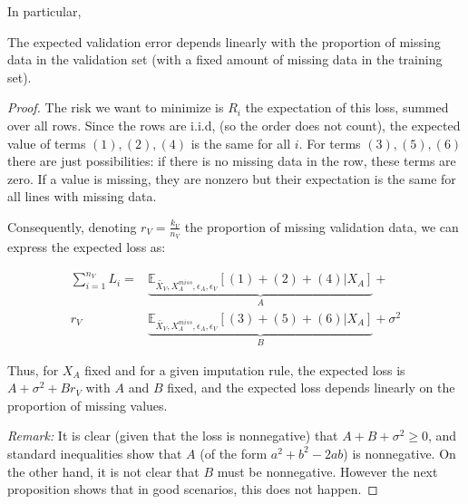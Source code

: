 In particular,
\begin{proposition}
\label{prop.linear}
The expected validation error depends linearly with the proportion of missing data in the validation set (with a fixed amount of missing data in the training set).
\end{proposition}
\begin{proof}
The risk we want to minimize is $R_i$ the expectation of this loss, summed over all rows. Since the rows are i.i.d, (so the order does not count), the expected value of terms $(1),(2),(4)$ is the same for all $i$. For terms $(3), (5), (6)$ there are just possibilities: if there is no missing data in the row, these terms are zero. If a value is missing, they are nonzero but their expectation is the same for all lines with missing data. 

Consequently, denoting $r_V = \frac{k_V}{n_V}$ the proportion of missing validation data, we can express the expected loss as:

\begin{align}
\label{eq.loss}
\sum\limits_{i=1}^{n_V} L_i = &\underbrace{\mathbb{E}_{\tilde{X_V}, X_A^{miss}, \epsilon_A, \epsilon_V}[(1) + (2) + (4)\vert X_A]}_{A} + \\ 
r_V& \underbrace{\mathbb{E}_{\tilde{X_V}, X_A^{miss}, \epsilon_A, \epsilon_V}[(3) + (5) + (6)\vert X_A]}_{B} + \sigma^2
\end{align}

Thus, for $X_A$ fixed and for a given imputation rule, the expected loss is $A + \sigma^2 + Br_V$ with $A$ and $B$ fixed, and the expected loss depends linearly on the proportion of missing values. 

\emph{Remark:} It is clear (given that the loss is nonnegative) that $A+B+\sigma^2 \ge 0$, and standard inequalities show that $A$ (of the form $a^2 + b^2 - 2ab$) is nonnegative. On the other hand, it is not clear that $B$ must be nonnegative. However the next proposition shows that in good scenarios, this does not happen.
\end{proof}

